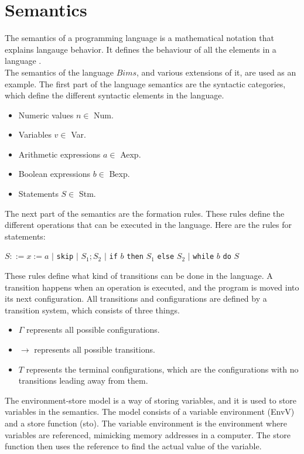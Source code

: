 \section{Semantics}
\label{sec:semantics}

The semantics of a programming language is a mathematical notation that explains langauge behavior. 
It defines the behaviour of all the elements in a language \cite{misc:sem}.\\ \indent
The semantics of the language $Bims$, and various extensions of it, are used as an example. 
The first part of the language semantics are the syntactic categories, which define the different syntactic elements in the language.

\begin{itemize}
\item Numeric values $n \in$ Num.
\item Variables $v \in$ Var.
\item Arithmetic expressions $a \in$ Aexp.
\item Boolean expressions $b \in$ Bexp.
\item Statements $S \in$ Stm.
\end{itemize}

The next part of the semantics are the formation rules. 
These rules define the different operations that can be executed in the language. 
Here are the rules for statements: \newline

$S ::= x := a$ $|$ \texttt{skip} $|$ $S_1;S_2$ $|$ \texttt{if} $b$ \texttt{then} $S_1$ \texttt{else} $S_2$ $|$ \texttt{while} $b$ \texttt{do} $S$\newline

These rules define what kind of transitions can be done in the language. 
A transition happens when an operation is executed, and the program is moved into its next configuration. 
All transitions and configurations are defined by a transition system, which consists of three things. 

\begin{itemize}
\item $\Gamma$ represents all possible configurations. 
\item $\rightarrow$ represents all possible transitions.
\item $T$ represents the terminal configurations, which are the configurations with no transitions leading away from them.
\end{itemize}

The environment-store model is a way of storing variables, and it is used to store variables in the semantics. \newline
The model consists of a variable environment (EnvV) and a store function (sto). 
The variable environment is the environment where variables are referenced, mimicking memory addresses in a computer. 
The store function then uses the reference to find the actual value of the variable. \newline

